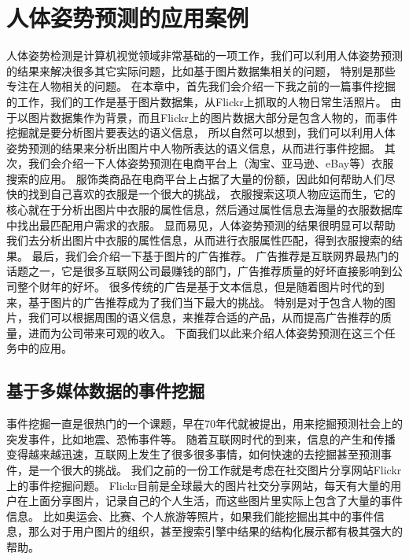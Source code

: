 
\chapter{人体姿势预测的应用案例}
\label{chap:app}
人体姿势检测是计算机视觉领域非常基础的一项工作，我们可以利用人体姿势预测的结果来解决很多其它实际问题，比如基于图片数据集相关的问题，
特别是那些专注在人物相关的问题。
在本章中，首先我们会介绍一下我之前的一篇事件挖掘的工作，我们的工作是基于图片数据集，从Flickr上抓取的人物日常生活照片。
由于以图片数据集作为背景，而且Flickr上的图片数据大部分是包含人物的，而事件挖掘就是要分析图片要表达的语义信息，
所以自然可以想到，我们可以利用人体姿势预测的结果来分析出图片中人物所表达的语义信息，从而进行事件挖掘。
其次，我们会介绍一下人体姿势预测在电商平台上（淘宝、亚马逊、eBay等）衣服搜索的应用。
服饰类商品在电商平台上占据了大量的份额，因此如何帮助人们尽快的找到自己喜欢的衣服是一个很大的挑战，
衣服搜索这项人物应运而生，它的核心就在于分析出图片中衣服的属性信息，然后通过属性信息去海量的衣服数据库中找出最匹配用户需求的衣服。
显而易见，人体姿势预测的结果很明显可以帮助我们去分析出图片中衣服的属性信息，从而进行衣服属性匹配，得到衣服搜索的结果。
最后，我们会介绍一下基于图片的广告推荐。
广告推荐是互联网界最热门的话题之一，它是很多互联网公司最赚钱的部门，广告推荐质量的好坏直接影响到公司整个财年的好坏。
很多传统的广告是基于文本信息，但是随着图片时代的到来，基于图片的广告推荐成为了我们当下最大的挑战。
特别是对于包含人物的图片，我们可以根据周围的语义信息，来推荐合适的产品，从而提高广告推荐的质量，进而为公司带来可观的收入。
下面我们以此来介绍人体姿势预测在这三个任务中的应用。

\section{基于多媒体数据的事件挖掘}
事件挖掘一直是很热门的一个课题，早在70年代就被提出，用来挖掘预测社会上的突发事件，比如地震、恐怖事件等。
随着互联网时代的到来，信息的产生和传播变得越来越迅速，互联网上发生了很多很多事情，如何快速的去挖掘甚至预测事件，是一个很大的挑战。
我们之前的一份工作就是考虑在社交图片分享网站Flickr上的事件挖掘问题。
Flickr目前是全球最大的图片社交分享网站，每天有大量的用户在上面分享图片，记录自己的个人生活，而这些图片里实际上包含了大量的事件信息。
比如奥运会、比赛、个人旅游等照片，如果我们能挖掘出其中的事件信息，那么对于用户图片的组织，甚至搜索引擎中结果的结构化展示都有极其强大的帮助。

